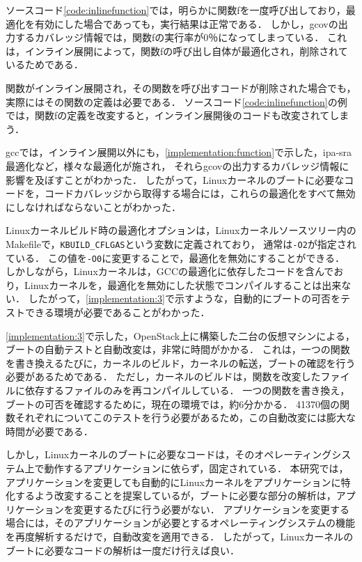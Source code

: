 \documentclass[graduation-thesis]{mlarticle}
\begin{document}
ソースコード\ref{code:inlinefunction}では，明らかに関数fを一度呼び出しており，最適化を有効にした場合であっても，実行結果は正常である．
しかし，gcovの出力するカバレッジ情報では，関数fの実行率が0％になってしまっている．
これは，インライン展開によって，関数fの呼び出し自体が最適化され，削除されているためである．

関数がインライン展開され，その関数を呼び出すコードが削除された場合でも，実際にはその関数の定義は必要である．
ソースコード\ref{code:inlinefunction}の例では，関数fの定義を改変すると，インライン展開後のコードも改変されてしまう．

gccでは，インライン展開以外にも，\ref{implementation:function}で示した，ipa-sra最適化など，様々な最適化が施され，
それらgcovの出力するカバレッジ情報に影響を及ぼすことがわかった．
したがって，Linuxカーネルのブートに必要なコードを，コードカバレッジから取得する場合には，これらの最適化をすべて無効にしなければならないことがわかった．

Linuxカーネルビルド時の最適化オプションは，Linuxカーネルソースツリー内のMakefileで，\texttt{KBUILD\_CFLGAS}という変数に定義されており，
通常は\texttt{-O2}が指定されている．
この値を\texttt{-O0}に変更することで，最適化を無効にすることができる．
しかしながら，Linuxカーネルは，GCCの最適化に依存したコードを含んでおり，Linuxカーネルを，最適化を無効にした状態でコンパイルすることは出来ない．
したがって，\ref{implementation:3}で示すような，自動的にブートの可否をテストできる環境が必要であることがわかった．

\ref{implementation:3}で示した，OpenStack上に構築した二台の仮想マシンによる，ブートの自動テストと自動改変は，非常に時間がかかる．
これは，一つの関数を書き換えるたびに，カーネルのビルド，カーネルの転送，ブートの確認を行う必要があるためである．
ただし，カーネルのビルドは，関数を改変したファイルに依存するファイルのみを再コンパイルしている．
一つの関数を書き換え，ブートの可否を確認するために，現在の環境では，約6分かかる．
41370個の関数それぞれについてこのテストを行う必要があるため，この自動改変には膨大な時間が必要である．

しかし，Linuxカーネルのブートに必要なコードは，そのオペレーティングシステム上で動作するアプリケーションに依らず，固定されている．
本研究では，アプリケーションを変更しても自動的にLinuxカーネルをアプリケーションに特化するよう改変することを提案しているが，ブートに必要な部分の解析は，アプリケーションを変更するたびに行う必要がない．
アプリケーションを変更する場合には，そのアプリケーションが必要とするオペレーティングシステムの機能を再度解析するだけで，自動改変を適用できる．
したがって，Linuxカーネルのブートに必要なコードの解析は一度だけ行えば良い．
\end{document}
